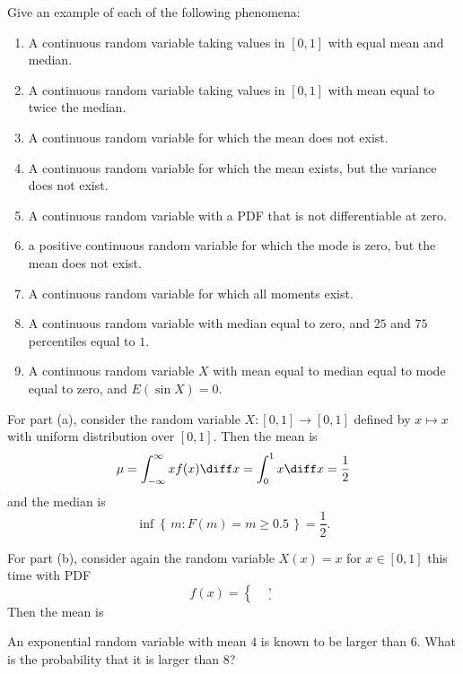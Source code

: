 \begin{problem}[Handout 13, \# 16]
  Give an example of each of the following phenomena:
  \begin{enumerate}[label=(\alph*),noitemsep]
  \item A continuous random variable taking values in \([0,1]\) with equal
    mean and median.
  \item A continuous random variable taking values in \([0,1]\) with mean
    equal to twice the median.
  \item A continuous random variable for which the mean does not exist.
  \item A continuous random variable for which the mean exists, but the
    variance does not exist.
  \item A continuous random variable with a PDF that is not differentiable
    at zero.
  \item a positive continuous random variable for which the mode is zero,
    but the mean does not exist.
  \item A continuous random variable for which all moments exist.
  \item A continuous random variable with median equal to zero, and
    \(25\) and \(75\) percentiles equal to \(1\).
  \item A continuous random variable \(X\) with mean equal to median equal
    to mode equal to zero, and \(E(\sin X)=0\).
  \end{enumerate}
\end{problem}
\begin{solution}
  For part (a), consider the random variable \(X\colon[0,1]\to[0,1]\)
  defined by \(x\mapsto x\) with uniform distribution over \([0,1]\). Then
  the mean is
  \[
    \mu=\int_{-\infty}^\infty xf(x)\diff x=\int_0^1 x\diff x=\frac{1}{2}
  \]
  and the median is
  \[
    \inf\left\{\,m:F(m)=m\geq 0.5\,\right\}=\frac{1}{2}.
  \]

  For part (b), consider again the random variable \(X(x)=x\) for
  \(x\in[0,1]\) this time with PDF
  \[
    f(x)=
    \begin{cases}
      &,\\
      &.
    \end{cases}
  \]
  Then the mean is
\end{solution}
\newpage

\begin{problem}[Handout 13, \# 17]
  An exponential random variable with mean \(4\) is known to be larger than
  \(6\). What is the probability that it is larger than \(8\)?
\end{problem}
\begin{solution}

\end{solution}
\newpage

